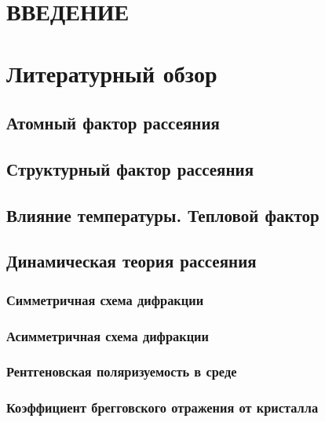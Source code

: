 \documentclass[pdftex,a4paper,14pt,english,russian]{extarticle}
\numberwithin{equation}{subsection}
\begin{document}


\setcounter{page}{5}
\begin{center}
\tableofcontents
\end{center}


\newpage
\section*{ \centering ВВЕДЕНИЕ }
  
  \newpage
\section{Литературный обзор}
  \subsection{Атомный фактор рассеяния}
    
  \subsection{Структурный фактор рассеяния}
    
  \subsection{Влияние температуры. Тепловой фактор}
    
  \subsection{Динамическая теория рассеяния}
    \subsubsection{Симметричная схема дифракции}
      
    \subsubsection{Асимметричная схема дифракции}
      
    \subsubsection{Рентгеновская поляризуемость в среде}
      
    \subsubsection{Коэффициент брегговского отражения от кристалла}
      
\end{document}
